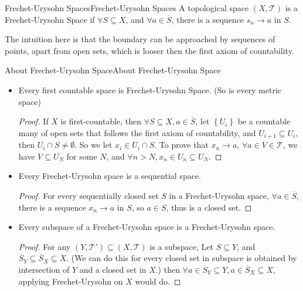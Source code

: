 \documentclass[../main.tex]{subfiles}
\begin{document}
\begin{definition}{Frechet-Urysohn Spaces}{Frechet-Urysohn Spaces}
A topological space $(X,\mathcal{T})$ is a Frechet-Urysohn Space if $\forall S \subseteq X$, and $\forall a\in \overline{S}$, there is a sequence $s_n \rightarrow a$ in $S$.
\end{definition}

\begin{remark}
The intuition here is that the boundary can be approached by sequences of points, apart from open sets, which is looser then the first axiom of countability.
\end{remark}

\begin{proposition}{About Frechet-Urysohn Space}{About Frechet-Urysohn Space}
\begin{itemize}
\item Every first countable space is Frechet-Urysohn Space. (So is every metric space)
	\begin{proof}
	If $X$ is first-countable, then $\forall S \subseteq X,a\in \overline{S}$, let $\left\{ U_i \right\}$ be a countable many of open sets that follows the first axiom of countability, and $U_{i+1} \subseteq U_i$, then $U_i \cap S\neq \emptyset $. So we let $x_i\in U_i\cap S$. To prove that $x_n \rightarrow a$, $\forall a\in V\in \mathcal{T}$, we have $V \subseteq U_N$ for some $N$, and $\forall n>N,x_n\in U_n \subseteq U_N$.
	\end{proof}
\item Every Frechet-Urysohn space is a sequential space.
	\begin{proof}
	For every sequentially closed set $S$ in a Frechet-Urysohn space, $\forall a\in \overline{S}$, there is a sequence $x_n \rightarrow a$ in $S$, so $a\in S$, thus is a closed set.
	\end{proof}
\item Every subspace of a Frechet-Urysohn space is a Frechet-Urysohn space.
	\begin{proof}
	For any $(Y,\mathcal{T}') \subseteq (X,\mathcal{T})$ is a subspace, Let $S \subseteq Y$, and $\overline{S}_Y \subseteq \overline{S}_X \subseteq X$. (We can do this for every closed set in subspace is obtained by intersection of $Y$ and a closed set in $X$.) then $\forall a\in \overline{S}_Y \subseteq Y, a\in \overline{S}_X \subseteq X$, applying Frechet-Urysohn on $X$ would do.
	\end{proof}
\end{itemize}
\end{proposition}
\end{document}
